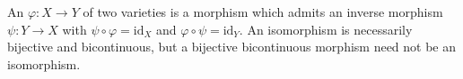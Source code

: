 An  $\varphi: X \to Y$ of two varieties is a morphism which admits an inverse morphism $\psi: Y \to X$ with $\psi \circ \varphi = \mathrm{id}_X$ and $\varphi \circ \psi = \mathrm{id}_Y$. An isomorphism is necessarily bijective and bicontinuous, but a bijective bicontinuous morphism need not be an isomorphism.

